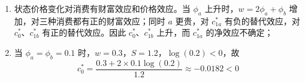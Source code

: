 \begin{solution}
\begin{enumerate}[label=(\alph*)]
\[\begin{aligned}
            c_{1b}^{*}&=\frac{2\phi_{a}+\phi_{b}+\phi_{a}\log(2\phi_{a})-\log(2\phi_{b})-\phi_{a}\log(2\phi_{b})}{1+\phi_{a}+\phi_{b}}
        \end{aligned}
    \]
    \item 状态价格变化对消费有财富效应和价格效应。当 $\phi_{a}$ 上升时，$w=2\phi_{a}+\phi_{b}$ 增加，对三种消费都有正的财富效应；同时 $a$ 更贵，对 $c_{1a}^{*}$ 有负的替代效应，对 $c_{0}^{*}$、$c_{1b}^{*}$ 有正的替代效应。因此 $c_{0}^{*}$、$c_{1b}^{*}$ 上升，而 $c_{1a}^{*}$ 的净效应不确定；
    \item 当 $\phi_{a}=\phi_{b}=0.1$ 时，$w=0.3$，$S=1.2$，$\log(0.2)<0$，故
    \[
        c_{0}^{*}=\frac{0.3+2\times 0.1\log(0.2)}{1.2}\approx -0.0182<0
    \]
\end{enumerate}
\end{solution}

